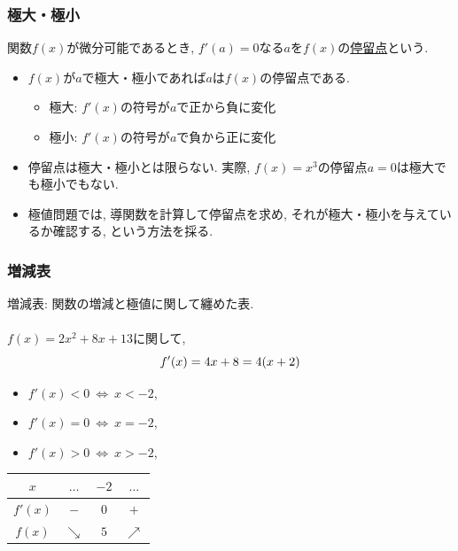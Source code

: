 


\begin{frame}
\frametitle{極大・極小}


\begin{Def}
関数$f(x)$が微分可能であるとき, $f'(a)=0$なる$a$を$f(x)$の\underline{停留点}という. 
\end{Def}

\begin{itemize}
\item $f(x)$が$a$で極大・極小であれば$a$は$f(x)$の停留点である. 
\begin{itemize}
\item 極大: $f'(x)$の符号が$a$で正から負に変化
\item 極小: $f'(x)$の符号が$a$で負から正に変化
\end{itemize}
\item 停留点は極大・極小とは限らない. 実際, $f(x)=x^3$の停留点$a=0$は極大でも極小でもない. 
\item 極値問題では, 導関数を計算して停留点を求め, それが極大・極小を与えているか確認する, という方法を採る. 
\end{itemize}
\end{frame}






\begin{frame}
\frametitle{増減表}

増減表: 関数の増減と極値に関して纏めた表.\\
\ \\

$f(x)=2x^2+8x+13$に関して, 
$$
f'(x)=4x+8=4(x+2) \vspace{-4.5mm}
$$
\begin{itemize}
\item $f'(x)<0 \ \Leftrightarrow \ x<-2$, 
\item $f'(x)=0 \ \Leftrightarrow \ x=-2$, 
\item $f'(x)>0 \ \Leftrightarrow \ x>-2$, 
\end{itemize}

\begin{table}[htb]
\begin{center}
\begin{tabular}{c|c|c|c}
$x$ & $\dots$ & $-2$ & $\dots$ \\ \hline 
$f'(x)$   & $-$ & 0  & $+$   \\ \hline 
$f(x)$   & $\searrow$ & $5$ &  $\nearrow$  
  \end{tabular}
  \end{center}
\end{table}

\end{frame}




